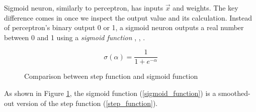 Sigmoid neuron, similarly to perceptron, has inputs $\vec{x}$ and weights. The key difference comes in once we inspect the output value and its calculation. Instead of perceptron's binary output 0 or 1, a sigmoid neuron outputs a real number between 0 and 1 using a \textit{sigmoid function} \cite{nndl2015michaelnielsen}, \cite{rojas2013neural}, \cite{matous}.

\begin{equation}
    {\sigma(\alpha) = \frac{1}{1 + e^{-\alpha}}}
\end{equation}

\begin{figure}[h]
	\centering
    \qquad
    \caption{Comparison between step function and sigmoid function}
    \label{sigmoid_neuron}
\end{figure}
As shown in Figure \ref{sigmoid_neuron}, the sigmoid function (\ref{sigmoid_function}) is a smoothed-out version of the step function (\ref{step_function}).
